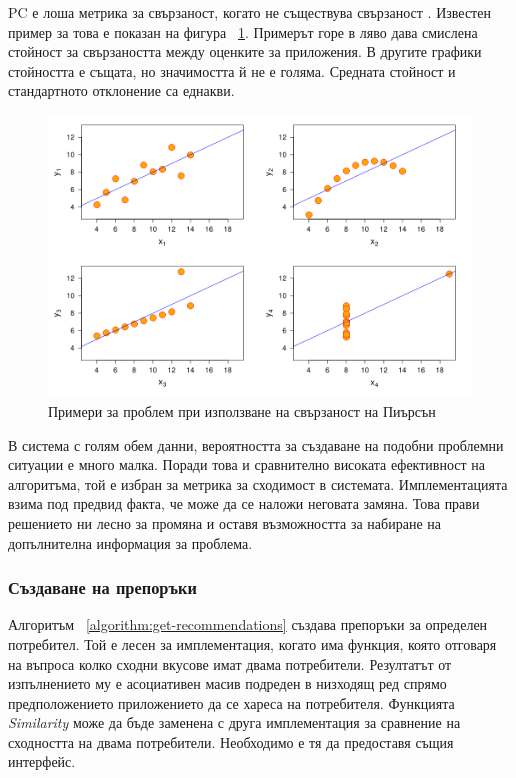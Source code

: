 		\vspace{2em}
		
		\ac{PC} е лоша метрика за свързаност, когато не съществува свързаност \cite{Babenko}. Известен пример за това е показан на фигура ~\ref{figure:anscombe-quartet}. Примерът горе в ляво дава смислена стойност за свързаността между оценките за приложения. В другите графики стойността е същата, но значимостта й не е голяма. Средната стойност и стандартното отклонение са еднакви.
		
		\begin{figure}[htbp]
			\centering	
 			\includegraphics[scale=0.8]{assets/Anscombe-quartet.png}
			\caption{Примери за проблем при използване на свързаност на Пиърсън}
			\label{figure:anscombe-quartet}
		\end{figure}
		
				В система с голям обем данни, вероятността за създаване на подобни проблемни ситуации е много малка. Поради това и сравнително високата ефективност на алгоритъма, той е избран за метрика за сходимост в системата. Имплементацията взима под предвид факта, че може да се наложи неговата замяна. Това прави решението ни лесно за промяна и оставя възможността за набиране на допълнителна информация за проблема.
				
		\subsubsection{Създаване на препоръки}
		
		Алгоритъм ~\ref{algorithm:get-recommendations} създава препоръки за определен потребител. Той е лесен за имплементация, когато има функция, която отговаря на въпроса колко сходни вкусове имат двама потребители. Резултатът от изпълнението му е асоциативен масив подреден в низходящ ред спрямо предположението приложението да се хареса на потребителя. Функцията \emph{Similarity} може да бъде заменена с друга имплементация за сравнение на сходността на двама потребители. Необходимо е тя да предоставя същия интерфейс.
		
